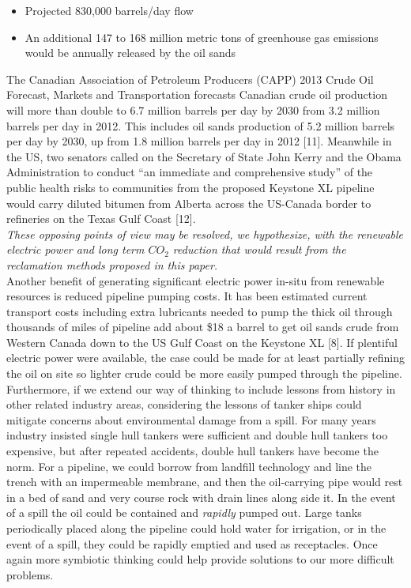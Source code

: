 \documentclass[11pt]{article}
\begin{document}
\begin{itemize}
\item Projected 830,000 barrels/day flow
\item An additional 147 to 168 million metric tons of greenhouse gas emissions would be annually released by the oil sands
\end{itemize}

The Canadian Association of Petroleum Producers (CAPP) 2013 Crude Oil Forecast, Markets and Transportation forecasts Canadian crude oil production will more than double to 6.7 million barrels per day by 2030 from 3.2 million barrels per day in 2012. This includes oil sands production of 5.2 million barrels per day by 2030, up from 1.8 million barrels per day in 2012 [11]. Meanwhile in the US, two senators called on the Secretary of State John Kerry and the Obama Administration to conduct ``an immediate and comprehensive study'' of the public health risks to communities from the proposed Keystone XL pipeline would carry diluted bitumen from Alberta across the US-Canada border to refineries on the Texas Gulf Coast [12]. \\

\emph{These opposing points of view may be resolved, we hypothesize, with the renewable electric power and long term $CO_2$ reduction that would result from the reclamation methods proposed in this paper.} \\

Another benefit of generating significant electric power in-situ from renewable resources is reduced pipeline pumping costs. It has been estimated current transport costs including extra lubricants needed to pump the thick oil through thousands of miles of pipeline add about \$18 a barrel to get oil sands crude from Western Canada down to the US Gulf Coast on the Keystone XL [8]. If plentiful electric power were available, the case could be made for at least partially refining the oil on site so lighter crude could be more easily pumped through the pipeline. \\

Furthermore, if we extend our way of thinking to include lessons from history in other related industry areas, considering the lessons of tanker ships could mitigate concerns about environmental damage from a spill.  For many years industry insisted single hull tankers were sufficient and double hull tankers too expensive, but after repeated accidents, double hull tankers have become the norm.  For a pipeline, we could borrow from landfill technology and line the trench with an impermeable membrane, and then the oil-carrying pipe would rest in a bed of sand and very course rock with drain lines along side it.  In the event of a spill the oil could be contained and \emph{rapidly} pumped out.  Large tanks periodically placed along the pipeline could hold water for irrigation, or in the event of a spill, they could be rapidly emptied and used as receptacles.  Once again more symbiotic thinking could help provide solutions to our more difficult problems.
\end{document}
